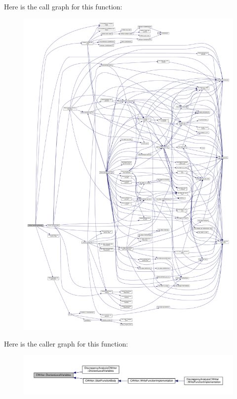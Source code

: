 Here is the call graph for this function\+:
\nopagebreak
\begin{figure}[H]
\begin{center}
\leavevmode
\includegraphics[width=350pt]{d3/d59/classCWriter_ab269f8330141bcdeecda80a23e60c8f5_cgraph}
\end{center}
\end{figure}
Here is the caller graph for this function\+:
\nopagebreak
\begin{figure}[H]
\begin{center}
\leavevmode
\includegraphics[width=350pt]{d3/d59/classCWriter_ab269f8330141bcdeecda80a23e60c8f5_icgraph}
\end{center}
\end{figure}
\mbox{\label{classCWriter_a34b098dce3408ece8f310af807c52368}} 
